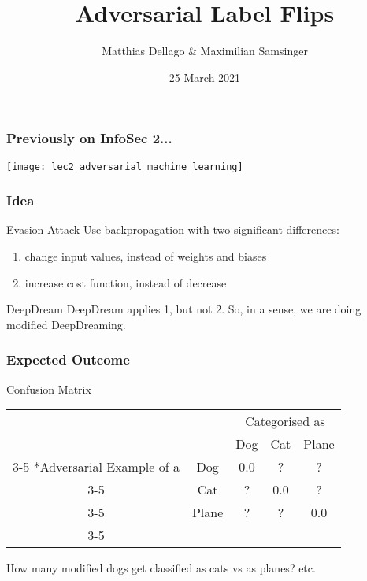 \documentclass[10pt,usepdftitle=false,aspectratio=169]{beamer}
\title{Adversarial Label Flips}
\author{Matthias Dellago \& Maximilian Samsinger}
\date{25 March 2021}
\begin{document}
\DeclarePairedDelimiter\abs{\lvert}{\rvert}%
\DeclarePairedDelimiter\norm{\lVert}{\rVert}%
\DeclarePairedDelimiter\ceil{\lceil}{\rceil}
\DeclarePairedDelimiter\floor{\lfloor}{\rfloor}

\begin{frame}[plain]
	\maketitle
\end{frame}	

\begin{frame}[fragile]
	\frametitle{Previously on InfoSec 2...}
		\texttt{[image: lec2\_adversarial\_machine\_learning]}
\end{frame}

\begin{frame}[fragile]
	\frametitle{Idea}
		\begin{block}{Evasion Attack}
			Use backpropagation with two significant differences:
			\begin{enumerate}
				\item change input values, instead of weights and biases
				\item increase cost function, instead of decrease
			\end{enumerate} 
		\end{block}
		\begin{block}{DeepDream}
			DeepDream applies 1, but not 2. So, in a sense, we are doing modified DeepDreaming.
		\end{block}
\end{frame}

\begin{frame}[fragile]
	\frametitle{Expected Outcome}
	\begin{block}{Confusion Matrix}
		  \begin{table}
			\setlength{\extrarowheight}{2pt}
			\begin{tabular}{cc|c|c|c|}
				& \multicolumn{1}{c}{} & \multicolumn{3}{c}{Categorised as}\\
				& \multicolumn{1}{c}{} & \multicolumn{1}{c}{Dog}  & \multicolumn{1}{c}{Cat} & \multicolumn{1}{c}{Plane} \\\cline{3-5}
				\multirow{3}*{Adversarial Example of a}  & Dog & 0.0 & ? & ?\\\cline{3-5}
				& Cat & ? & 0.0 &  ? \\\cline{3-5}
				& Plane & ? & ? &  0.0 \\\cline{3-5}
			\end{tabular}
		\end{table}
	How many modified dogs get classified as cats vs as planes? etc.
	\end{block}
\end{frame}
\end{document}
